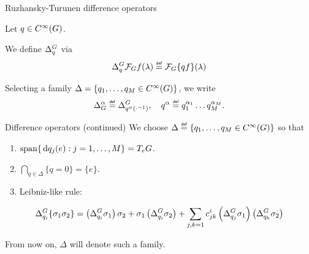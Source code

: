 \documentclass{beamer}
\begin{document}
\begin{frame}{Ruzhansky-Turunen difference operators}
    \begin{definition}
        Let $q \in {C^\infty(G)}$.

        We define ${\Delta^{G}_{q}}$ via
        \begin{align*}
            \DifferenceOperator q \Fourier f(\lambda)
            \defeq \Fourier \{q f\}(\lambda)
        \end{align*}
    \end{definition}

    \pause

    Selecting a family $\Delta = \{q_1, \dots, q_M \in {C^\infty(G)}\}$,
    we write
    \begin{align*}
        \DifferenceOperatorOrder \alpha \defeq \DifferenceOperator {q^\alpha(\dummy^{-1})},
        \quad q^\alpha \defeq q^{\alpha_1}_1 \dots q^{\alpha_M}_M.
    \end{align*}
\end{frame}

\begin{frame}{Difference operators (continued)}
    We choose $\Delta \defeq \{q_1, \dots, q_M \in \SmoothFunctions \Group\}$ so that
    \begin{enumerate}
        \item
            $\operatorname{span} \{\,\mathrm{d} q_j(e) : j = 1, \dots, M\} = T_e G$.
            \pause
        \item
            $\bigcap_{q \in \Delta} \{q = 0\} = \{e\}$.
            \pause
        \item
            Leibniz-like rule:
    \end{enumerate}
    \begin{align*}
        {\Delta^{G}_{q_i}} \{\sigma_1 \sigma_2\}
        =
        \left({\Delta^{G}_{q_i}} \sigma_1 \right) \sigma_2
        + \sigma_1 \left({\Delta^{G}_{q_i}} \sigma_2\right)
        + \sum_{j, k = 1} c^i_{j k} \left({\Delta^{G}_{q_j}} \sigma_1\right) \left({\Delta^{G}_{q_k}} \sigma_2\right)
    \end{align*}

    \pause

    From now on,
    $\Delta$ will denote such a family.
\end{frame}
\end{document}
